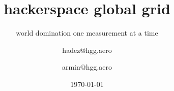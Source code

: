 




\usepackage{url}
%

\usepackage{listings}
  
\usepackage[utf8]{inputenc}
\usepackage[T1]{fontenc}
\usepackage{lmodern}
\usepackage[ngerman]{babel}

\usepackage{amsmath}

\usepackage{array}
\usepackage{longtable}
\usepackage{graphicx}
\graphicspath{{./pic/}}

\newcommand{\shack}{\includegraphics<.->[height=1em]{shack_brightbg}}


\date{\today}

 
\title{hackerspace global grid} 
\subtitle{world domination one measurement at a time}
\author[hdz, reloc0]{hadez@hgg.aero \and armin@hgg.aero}

\subject{Vortragsreihe des CCCS}

\titlegraphic{}


\AtBeginSection
{
  \begin{frame}
  \end{frame}
}






